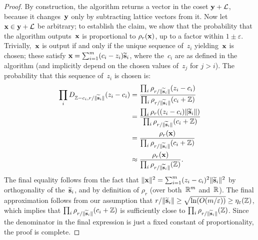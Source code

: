 \documentclass[11pt]{article}
\begin{document}
\begin{proof}
  By construction, the algorithm returns a vector in the coset
  $\mathbf{y} + \mathcal{L}$, because it changes~$\mathbf{y}$ only by subtracting
  lattice vectors from it. Now let~$\mathbf{x} \in \mathbf{y}+\mathcal{L}$ be
  arbitrary; to establish the claim, we show that the probability that
  the algorithm outputs~$\mathbf{x}$ is proportional to $\rho_r(\mathbf{x})$, up
  to a factor within $1 \pm \varepsilon$. Trivially,~$\mathbf{x}$ is output
  if and only if the unique sequence of~$z_i$ yielding~$\mathbf{x}$ is
  chosen; these satisfy
  $\mathbf{x} = \sum_{i=1}^{m} (c_{i} - z_{i}) \widetilde{\mathbf{s}}_{i}$, where
  the~$c_{i}$ are as defined in the algorithm (and implicitly depend
  on the chosen values of~$z_{j}$ for $j > i$). The probability that
  this sequence of~$z_{i}$ is chosen is:
  \begin{align*}
    \prod_{i} D_{\mathbb{Z}-c_i,r/\lVert\widetilde{\mathbf{s}}_i\rVert}(z_i-c_i)
    &= \frac{\prod_{i}
      \rho_{r/\lVert\widetilde{\mathbf{s}}_i\rVert}(z_i-c_i)}{\prod_{i}
      \rho_{r/\lVert\widetilde{\mathbf{s}}_i\rVert}(c_i+\mathbb{Z})} \\
    &= \frac{\prod_{i} \rho_r((z_i-c_i)\lVert\widetilde{\mathbf{s}}_i\rVert)}{\prod_{i}
      \rho_{r/\lVert\widetilde{\mathbf{s}}_i\rVert}(c_i+\mathbb{Z})} \\
    &= \frac{\rho_r(\mathbf{x})}{\prod_{i}
      \rho_{r/\lVert\widetilde{\mathbf{s}}_i\rVert}(c_i+\mathbb{Z})} \\
    &\approx \frac{\rho_r(\mathbf{x})}{\prod_{i} \rho_{r/\lVert\widetilde{\mathbf{s}}_i\rVert}(\mathbb{Z})} . 
  \end{align*}
  The final equality follows from the fact that
  $\lVert\mathbf{x}\rVert^{2} = \sum_{i=1}^{m} (z_{i}-c_{i})^{2}
  \lVert\widetilde{\mathbf{s}}_{i}\rVert^{2}$ by orthogonality of
  the~$\widetilde{\mathbf{s}}_{i}$, and by definition of $\rho_{r}$ (over
  both~$\mathbb{R}^{m}$ and~$\mathbb{R}$). The final approximation follows from our
  assumption that
  $r/\lVert\widetilde{\mathbf{s}}_i\rVert \geq \sqrt{\ln(O(m/\varepsilon))} \geq
  \eta_{\varepsilon}(\mathbb{Z})$, which implies that
  $\prod_{i} \rho_{r/\lVert\widetilde{\mathbf{s}}_i\rVert}(c_i+\mathbb{Z})$ is sufficiently
  close to $\prod_{i} \rho_{r/\lVert\widetilde{\mathbf{s}}_i\rVert}(\mathbb{Z})$. Since the
  denominator in the final expression is just a fixed constant of
  proportionality, the proof is complete.
\end{proof}



\end{document}
